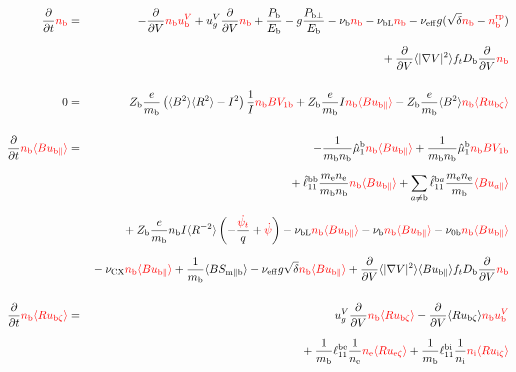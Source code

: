 \documentclass[11pt]{article}
\def\r#1{{\rm#1}}
\def\aves#1{\langle#1\rangle}
\def\para{\parallel}
\def\ddV{\frac{\partial}{\partial V}}
\def\ddt{\frac{\partial}{\partial t}}
\def\psid{\dot{\psi}}
\def\psit{\psi_t}
\def\psitd{\dot{\psit}}
\def\me{m_\r{e}}
\def\mb{m_\r{b}}
\def\nee{n_\r{e}}
\def\ni{n_\r{i}}
\def\nb{n_\r{b}}
\def\Zb{Z_\r{b}}
\def\uzt#1{u_{\r{#1}\zeta}}
\def\upara#1{u_{\r{#1}\para}}
\def\uV#1{u_\r{#1}^V}
\def\ugV{u_{g}^V}
\def\chis#1{\chi_\r{#1}}
\def\nun#1{\nu_\r{0#1}}
\def\nbrp{n_\r{b}^\r{rp}}
\def\Db{D_\r{b}}
\def\bri{\aves{B^2}\aves{R^2} - I^2}
\def\Pbpara{P_{\r{b}\parallel}}
\def\Pbperp{P_{\r{b}\perp}}
\def\Pb{P_\r{b}}
\def\Eb{E_\r{b}}
\def\nueff{\nu_\r{eff}}
\def\nuCX{\nu_\r{CX}}
\def\nub{\nu_\r{b}}
\def\nubL{\nu_\r{bL}}
\def\red#1{\textcolor{red}{#1}}
\begin{document}
%
\begin{eqnarray}
  \ddt \red{\nb} &=&
%
  - \ddV \red{\nb\uV{b}}
%
  + \ugV \ddV \red{\nb}
%
  +  \frac{\Pb}{\Eb}
%
  - g \frac{\Pbperp}{\Eb}
%
  - \nub \red{\nb}
%
  - \nubL \red{\nb}
%
  - \nueff g (\sqrt{\delta} \red{\nb} - \red{\nbrp})
%
\nonumber\\[2.5mm]&&{}
  + \ddV \aves{|\nabla V|^2} f_t \Db \ddV \red{\nb}
%
\\[5mm]
  0 &=&
%
    \Zb \frac{e}{\mb} \left( \bri \right) \frac{1}{I} \red{\nb B V_{1\r{b}}}
%
  + \Zb \frac{e}{\mb} I \red{\nb \aves{B\upara{b}}}
%
  - \Zb \frac{e}{\mb} \aves{B^2} \red{\nb \aves{R\uzt{b}}}
\\[5mm]
  \ddt \red{\nb \aves{B \upara{b}}} &=&
%
  - \frac{1}{\mb \nb} \hat{\mu}_1^\r{b} \red{\nb \aves{B \upara{b}}}
%
  + \frac{1}{\mb \nb} \hat{\mu}_1^\r{b} \red{\nb B V_{1\r{b}}}
\nonumber\\[2.5mm]&&{}
%
  + \hat{\ell}_{11}^\r{bb} \frac{\me\nee}{\mb\nb} \red{\nb \aves{B \upara{b}}}
%
  + \sum_{a\neq\r{b}} \hat{\ell}_{11}^{\r{b}a} \frac{\me\nee}{\mb} \red{\aves{B u_{a\para}}}
\nonumber\\[2.5mm]&&{}
%
  + \Zb \frac{e}{\mb} \nb I \aves{R^{-2}} \left( - \frac{\red{\psitd}}{q} + \red{\psid} \right)
%
  - \nubL \red{\nb \aves{B\upara{b}}}
%
  - \nub  \red{\nb \aves{B\upara{b}}}
%
  - \nun{b} \red{\nb \aves{B\upara{b}}}
\nonumber\\[2.5mm]&&{}
%
  - \nuCX \red{\nb \aves{B\upara{b}}}
%
%
  + \frac{1}{\mb} \aves{B S_{\r{m}\para\r{b}}}
%
  - \nueff g \sqrt{\delta} \red{\nb \aves{B\upara{b}}}
%
  + \ddV \aves{|\nabla V|^2} \aves{B\upara{b}} f_t \Db \ddV \red{\nb}
\\[5mm]
  \ddt \red{\nb \aves{R \uzt{b}}} &=&
%
  \ugV \ddV \red{\nb \aves{R \uzt{b}}}
%
  - \ddV \aves{R \uzt{b}} \red{\nb \uV{b}} 
%
\nonumber\\[2.5mm]&&{}
%
  + \frac{1}{\mb} \ell_{11}^\r{be} \frac{1}{\nee} \red{\nee \aves{R \uzt{e}}}
  + \frac{1}{\mb} \ell_{11}^\r{bi} \frac{1}{\ni}  \red{\ni  \aves{R \uzt{i}}}

\end{eqnarray}
\end{document}
